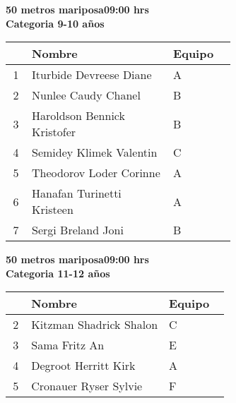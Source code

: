 \begin{minipage}{0.95\linewidth}\vspace{0.5cm} 
\begin{flushleft}
\textbf{
\hspace{-0.15cm}50 metros mariposa\hspace{1.5cm}09:00 hrs \\Categoria 9-10 años}\vspace{-0.2cm} 
\end{flushleft}
\begin{tabular}{cp{0.63\linewidth}l}
\hline
& \textbf{Nombre} & \textbf{Equipo} \\ \hline
1 & Iturbide Devreese Diane & A \\ 
2 & Nunlee Caudy Chanel & B \\ 
3 & Haroldson Bennick Kristofer & B \\ 
4 & Semidey Klimek Valentin & C \\ 
5 & Theodorov Loder Corinne & A \\ 
6 & Hanafan Turinetti Kristeen & A \\ 
7 & Sergi Breland Joni & B \\ 
\end{tabular}
\end{minipage}
\begin{minipage}{0.95\linewidth}\vspace{0.5cm} 
\begin{flushleft}
\textbf{
\hspace{-0.15cm}50 metros mariposa\hspace{1.5cm}09:00 hrs \\Categoria 11-12 años}\vspace{-0.2cm} 
\end{flushleft}
\begin{tabular}{cp{0.63\linewidth}l}
\hline
& \textbf{Nombre} & \textbf{Equipo} \\ \hline
2 & Kitzman Shadrick Shalon & C \\ 
3 & Sama Fritz An & E \\ 
4 & Degroot Herritt Kirk & A \\ 
5 & Cronauer Ryser Sylvie & F \\ 
\end{tabular}
\end{minipage}
